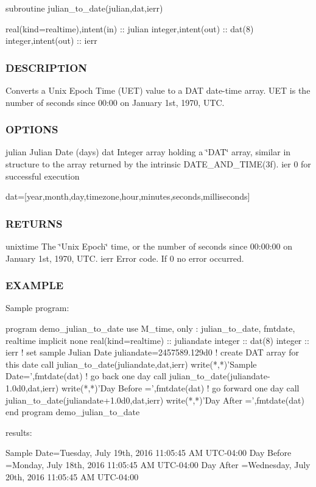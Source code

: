 \begin{DoxyVerb}subroutine julian_to_date(julian,dat,ierr)

 real(kind=realtime),intent(in) :: julian
 integer,intent(out)            :: dat(8)
 integer,intent(out)            :: ierr
\end{DoxyVerb}


\subsubsection*{D\+E\+S\+C\+R\+I\+P\+T\+I\+ON}

Converts a Unix Epoch Time (U\+ET) value to a D\+AT date-\/time array. U\+ET is the number of seconds since 00\+:00 on January 1st, 1970, U\+TC.

\subsubsection*{O\+P\+T\+I\+O\+NS}

julian Julian Date (days) dat Integer array holding a \char`\"{}\+D\+A\+T\char`\"{} array, similar in structure to the array returned by the intrinsic D\+A\+T\+E\+\_\+\+A\+N\+D\+\_\+\+T\+I\+M\+E(3f). ier 0 for successful execution \begin{DoxyVerb}      dat=[year,month,day,timezone,hour,minutes,seconds,milliseconds]
\end{DoxyVerb}
 \subsubsection*{R\+E\+T\+U\+R\+NS}

unixtime The \char`\"{}\+Unix Epoch\char`\"{} time, or the number of seconds since 00\+:00\+:00 on January 1st, 1970, U\+TC. ierr Error code. If 0 no error occurred.

\subsubsection*{E\+X\+A\+M\+P\+LE}

\begin{DoxyVerb}Sample program:

 program demo_julian_to_date
 use M_time, only : julian_to_date, fmtdate, realtime
 implicit none
 real(kind=realtime)     :: juliandate
 integer                 :: dat(8)
 integer                 :: ierr
    ! set sample Julian Date
    juliandate=2457589.129d0
    ! create DAT array for this date
    call julian_to_date(juliandate,dat,ierr)
    write(*,*)'Sample Date=',fmtdate(dat)
    ! go back one day
    call julian_to_date(juliandate-1.0d0,dat,ierr)
    write(*,*)'Day Before =',fmtdate(dat)
    ! go forward one day
    call julian_to_date(juliandate+1.0d0,dat,ierr)
    write(*,*)'Day After  =',fmtdate(dat)
 end program demo_julian_to_date

results:

 Sample Date=Tuesday, July 19th, 2016 11:05:45 AM UTC-04:00
 Day Before =Monday, July 18th, 2016 11:05:45 AM UTC-04:00
 Day After  =Wednesday, July 20th, 2016 11:05:45 AM UTC-04:00
\end{DoxyVerb}



